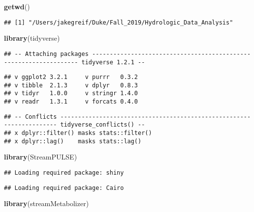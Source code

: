 \documentclass[]{article}
\newenvironment{Shaded}{\begin{snugshade}}{\end{snugshade}}
\newcommand{\KeywordTok}[1]{\textcolor[rgb]{0.13,0.29,0.53}{\textbf{#1}}}
\newcommand{\NormalTok}[1]{#1}
\begin{document}
\begin{Shaded}
\begin{Highlighting}[]
\KeywordTok{getwd}\NormalTok{()}
\end{Highlighting}
\end{Shaded}

\begin{verbatim}
## [1] "/Users/jakegreif/Duke/Fall_2019/Hydrologic_Data_Analysis"
\end{verbatim}

\begin{Shaded}
\begin{Highlighting}[]
\KeywordTok{library}\NormalTok{(tidyverse)}
\end{Highlighting}
\end{Shaded}

\begin{verbatim}
## -- Attaching packages ------------------------------------------------------------------ tidyverse 1.2.1 --
\end{verbatim}

\begin{verbatim}
## v ggplot2 3.2.1     v purrr   0.3.2
## v tibble  2.1.3     v dplyr   0.8.3
## v tidyr   1.0.0     v stringr 1.4.0
## v readr   1.3.1     v forcats 0.4.0
\end{verbatim}

\begin{verbatim}
## -- Conflicts --------------------------------------------------------------------- tidyverse_conflicts() --
## x dplyr::filter() masks stats::filter()
## x dplyr::lag()    masks stats::lag()
\end{verbatim}

\begin{Shaded}
\begin{Highlighting}[]
\KeywordTok{library}\NormalTok{(StreamPULSE)}
\end{Highlighting}
\end{Shaded}

\begin{verbatim}
## Loading required package: shiny
\end{verbatim}

\begin{verbatim}
## Loading required package: Cairo
\end{verbatim}

\begin{Shaded}
\begin{Highlighting}[]
\KeywordTok{library}\NormalTok{(streamMetabolizer)}
\end{Highlighting}
\end{Shaded}
\end{document}
